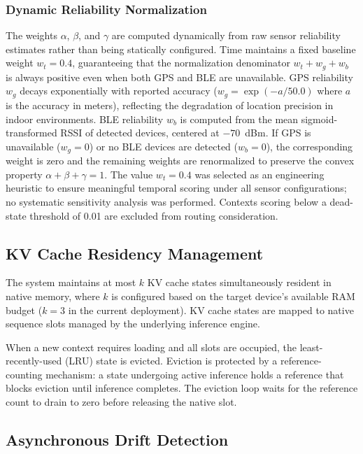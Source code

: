 \documentclass[journal]{IEEEtran}
\begin{document}
\subsubsection{Dynamic Reliability Normalization}
\label{sec:scoring_weights}
The weights $\alpha$, $\beta$, and $\gamma$ are computed dynamically from raw sensor reliability estimates rather than being statically configured. Time maintains a fixed baseline weight $w_t = 0.4$, guaranteeing that the normalization denominator $w_t + w_g + w_b$ is always positive even when both GPS and BLE are unavailable. GPS reliability $w_g$ decays exponentially with reported accuracy ($w_g = \exp(-a / 50.0)$ where $a$ is the accuracy in meters), reflecting the degradation of location precision in indoor environments. BLE reliability $w_b$ is computed from the mean sigmoid-transformed RSSI of detected devices, centered at $-70$~dBm. If GPS is unavailable ($w_g = 0$) or no BLE devices are detected ($w_b = 0$), the corresponding weight is zero and the remaining weights are renormalized to preserve the convex property $\alpha + \beta + \gamma = 1$. The value $w_t = 0.4$ was selected as an engineering heuristic to ensure meaningful temporal scoring under all sensor configurations; no systematic sensitivity analysis was performed. Contexts scoring below a dead-state threshold of 0.01 are excluded from routing consideration.

\subsection{KV Cache Residency Management}
\label{sec:residency}

The system maintains at most $k$ KV cache states simultaneously resident in native memory, where $k$ is configured based on the target device's available RAM budget ($k = 3$ in the current deployment). KV cache states are mapped to native sequence slots managed by the underlying inference engine.

When a new context requires loading and all slots are occupied, the least-recently-used (LRU) state is evicted. Eviction is protected by a reference-counting mechanism: a state undergoing active inference holds a reference that blocks eviction until inference completes. The eviction loop waits for the reference count to drain to zero before releasing the native slot.

\subsection{Asynchronous Drift Detection}
\label{sec:drift}
\end{document}
